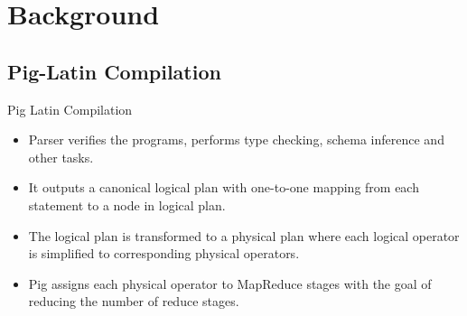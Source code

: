 \section{Background}

\subsection{Pig-Latin Compilation}
\begin{frame}{Pig Latin Compilation}
\begin{itemize}
	\item Parser verifies the programs, performs type checking, schema inference
          and other tasks.
	\item It outputs a canonical logical plan with one-to-one mapping from each statement to 		  a node in logical plan.
	\item The logical plan is transformed to a physical plan where each logical operator is       		  simplified to corresponding physical operators.
	\item Pig assigns each physical operator to MapReduce stages with the goal of reducing   		  the number of reduce stages.
	
\end{itemize}
\end{frame}

%

